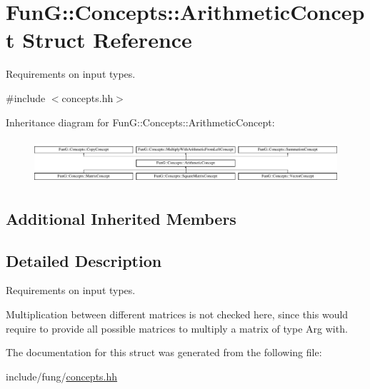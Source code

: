 \hypertarget{structFunG_1_1Concepts_1_1ArithmeticConcept}{\section{Fun\-G\-:\-:Concepts\-:\-:Arithmetic\-Concept Struct Reference}
\label{structFunG_1_1Concepts_1_1ArithmeticConcept}
}


Requirements on input types.  




{\ttfamily \#include $<$concepts.\-hh$>$}

Inheritance diagram for Fun\-G\-:\-:Concepts\-:\-:Arithmetic\-Concept\-:\begin{figure}[H]
\begin{center}
\leavevmode
\includegraphics[height=1.661721cm]{structFunG_1_1Concepts_1_1ArithmeticConcept}
\end{center}
\end{figure}
\subsection*{Additional Inherited Members}


\subsection{Detailed Description}
Requirements on input types. 

Multiplication between different matrices is not checked here, since this would require to provide all possible matrices to multiply a matrix of type Arg with. 

The documentation for this struct was generated from the following file\-:\begin{DoxyCompactItemize}
\item 
include/fung/\hyperlink{concepts_8hh}{concepts.\-hh}\end{DoxyCompactItemize}

